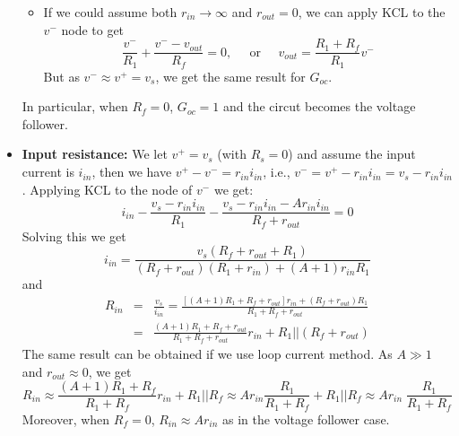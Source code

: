 \documentclass{article}
\begin{document}
\begin{itemize}
\begin{itemize}
      \item If we could assume both $r_{in}\rightarrow \infty$ and $r_{out}=0$, 
      we can apply KCL to the $v^-$ node to get
      \begin{equation} \frac{v^-}{R_1}+\frac{v^--v_{out}}{R_f}=0, \;\;\;\;\;
      \mbox{or}\;\;\;\;\; v_{out}=\frac{R_1+R_f}{R_1} v^- \end{equation}
      But as $v^-\approx v^+=v_s$, we get the same result for $G_{oc}$.
      \end{itemize}

      In particular, when $R_f=0$, $G_{oc}=1$ and the circut becomes the voltage
      follower.

    \item {\bf Input resistance:} We let $v^+=v_s$ (with $R_s=0$) and assume
      the input current is $i_{in}$, then we have $v^+-v^-=r_{in}i_{in}$, i.e.,
      $v^-=v^+-r_{in}i_{in}=v_s-r_{in}i_{in}$. Applying KCL to the node of $v^-$ 
      we get:
      \begin{equation} 
      i_{in}-\frac{v_s-r_{in}i_{in}}{R_1}-\frac{v_s-r_{in}i_{in}-A r_{in}i_{in}}{R_f+r_{out}}=0 
      \end{equation}
      Solving this we get
      \begin{equation}
      i_{in}=\frac{v_s(R_f+r_{out}+R_1)}{(R_f+r_{out})(R_1+r_{in})+(A+1)r_{in} R_1}
      \end{equation}
      and 
      \begin{eqnarray}
        R_{in}&=&\frac{v_s}{i_{in}}
        =\frac{[(A+1)R_1+R_f+r_{out}]r_{in}+(R_f+r_{out})R_1}{R_1+R_f+r_{out}}
        \nonumber\\
        &=&\frac{(A+1)R_1+R_f+r_{out}}{R_1+R_f+r_{out}}r_{in}+R_1||(R_f+r_{out}) 
        \nonumber
      \end{eqnarray}
      The same result can be obtained if we use loop current method.
      As $A\gg 1$ and $r_{out} \approx 0$, we get
      \begin{equation} 
      R_{in}  \approx \frac{(A+1)R_1+R_f}{R_1+R_f}r_{in}+R_1||R_f
      \approx A r_{in}\frac{R_1}{R_1+R_f}+R_1||R_f \approx A r_{in}\;\frac{R_1}{R_1+R_f}
      \end{equation}
      Moreover, when $R_f=0$, $R_{in}\approx A r_{in}$ as in the voltage follower case.


\end{itemize}
\end{document}
